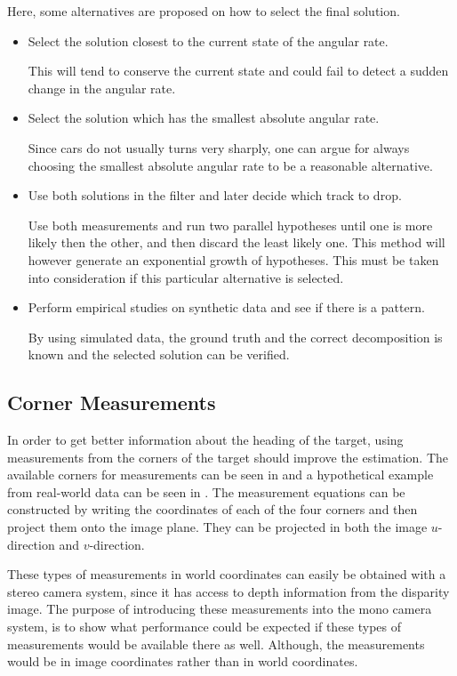 Here, some alternatives are proposed on how to select the final solution.
%
\begin{itemize}
    \item Select the solution closest to the current state of the angular rate.

    This will tend to conserve the current state and could fail to detect a sudden change in the angular rate.

    \item Select the solution which has the smallest absolute angular rate.

    Since cars do not usually turns very sharply, one can argue for always choosing the smallest absolute angular rate to be a reasonable alternative.

    \item Use both solutions in the filter and later decide which track to drop.

    Use both measurements and run two parallel hypotheses until one is more likely then the other, and then discard the least likely one.
    This method will however generate an exponential growth of hypotheses.
    This must be taken into consideration if this particular alternative is selected.

    \item Perform empirical studies on synthetic data and see if there is a pattern.

    By using simulated data, the ground truth and the correct decomposition is known and the selected solution can be verified.
\end{itemize}

\subsection{Corner Measurements}
In order to get better information about the heading of the target, using measurements from the corners of the target should improve the estimation.
The available corners for measurements can be seen in  and a hypothetical example from real-world data can be seen in .
The measurement equations can be constructed by writing the  coordinates of each of the four corners and then project them onto the image plane.
They can be projected in both the image $u$-direction and $v$-direction.

These types of measurements in world coordinates can easily be obtained with a stereo camera system, since it has access to depth information from the disparity image.
The purpose of introducing these measurements into the mono camera system, is to show what performance could be expected if these types of measurements would be available there as well.
Although, the measurements would be in image coordinates rather than in world coordinates.


